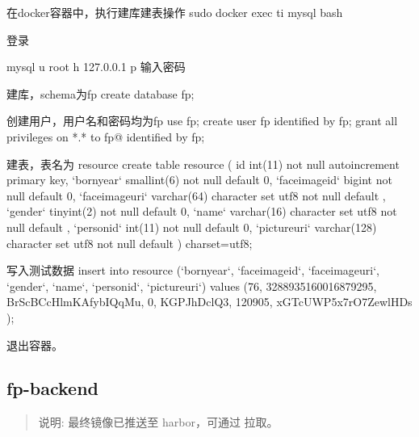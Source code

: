 \documentclass[letterpaper,10pt,english]{sphinxmanual}
\begin{document}
\begin{sphinxVerbatim}[commandchars=\\\{\}]
\PYGZsh{}\PYGZsh{} 在docker容器中，执行建库建表操作
sudo docker exec \PYGZhy{}ti mysql bash

\PYGZsh{}\PYGZsh{} 登录

\PYGZgt{} mysql \PYGZhy{}u root \PYGZhy{}h 127.0.0.1 \PYGZhy{}p
输入密码

\PYGZsh{}\PYGZsh{} 建库，schema为fp
\PYGZgt{} create database fp;

\PYGZsh{}\PYGZsh{} 创建用户，用户名和密码均为fp
\PYGZgt{}  use fp;
\PYGZgt{} create user fp identified by \PYGZsq{}fp\PYGZsq{};
\PYGZgt{} grant all privileges on *.* to fp@\PYGZsq{}\PYGZpc{}\PYGZsq{} identified by \PYGZsq{}fp\PYGZsq{};

\PYGZsh{}\PYGZsh{} 建表，表名为 resource
\PYGZgt{} create table resource (
	id int(11) not null auto\PYGZus{}increment primary key,
    {}`born\PYGZhy{}year{}` smallint(6) not null default 0,
    {}`face\PYGZhy{}image\PYGZhy{}id{}` bigint not null default 0,
    {}`face\PYGZhy{}image\PYGZhy{}uri{}` varchar(64) character set utf8 not null default \PYGZsq{}\PYGZsq{},
    {}`gender{}` tinyint(2) not null default 0,
    {}`name{}` varchar(16) character set utf8 not null default \PYGZsq{}\PYGZsq{},
    {}`person\PYGZhy{}id{}` int(11) not null default 0,
    {}`picture\PYGZhy{}uri{}` varchar(128) character set utf8 not null default \PYGZsq{}\PYGZsq{}
) charset=utf8;

\PYGZsh{}\PYGZsh{} 写入测试数据
\PYGZgt{} insert into resource ({}`born\PYGZhy{}year{}`, {}`face\PYGZhy{}image\PYGZhy{}id{}`, {}`face\PYGZhy{}image\PYGZhy{}uri{}`, {}`gender{}`, {}`name{}`, {}`person\PYGZhy{}id{}`, {}`picture\PYGZhy{}uri{}`) values (\PYGZsq{}76\PYGZsq{}, \PYGZsq{}3288935160016879295\PYGZsq{}, \PYGZsq{}BrScBCcHlmKAfybIQqMu\PYGZsq{}, \PYGZsq{}0\PYGZsq{}, \PYGZsq{}KGPJhDclQ3\PYGZsq{}, \PYGZsq{}120905\PYGZsq{}, \PYGZsq{}xGTcUWP5x7rO7ZewlHDs\PYGZsq{}
);
\end{sphinxVerbatim}

退出容器。


\subsection{fp-backend}
\label{\detokenize{docker/practice:fp-backend}}\begin{quote}

说明: 最终镜像已推送至 harbor，可通过 拉取。
\end{quote}
\end{document}
